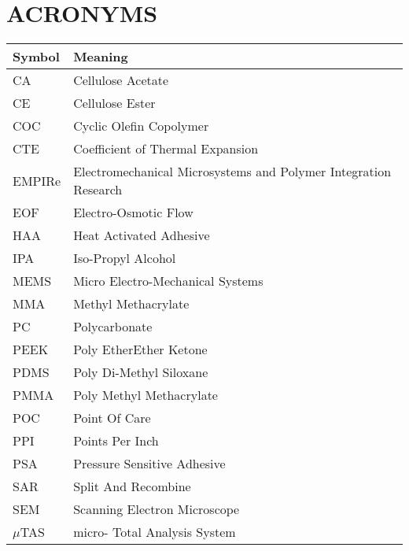 

\chapter*{\center\Huge{ACRONYMS}}


\begin{center}\small
\begin{tabular}{ll}\hline
\textbf{Symbol} & \textbf{Meaning}\\\hline
CA & Cellulose Acetate\\
CE & Cellulose Ester\\
COC & Cyclic Olefin Copolymer\\
CTE &Coefficient of Thermal Expansion\\
EMPIRe & Electromechanical Microsystems and Polymer Integration Research\\
EOF & Electro-Osmotic Flow\\
HAA & Heat Activated Adhesive\\
IPA & Iso-Propyl Alcohol\\
MEMS & Micro Electro-Mechanical Systems\\
MMA & Methyl Methacrylate\\
PC & Polycarbonate\\
PEEK &Poly EtherEther Ketone\\
PDMS & Poly Di-Methyl Siloxane\\
PMMA & Poly Methyl Methacrylate\\
POC & Point Of Care\\
PPI & Points Per Inch\\
PSA &Pressure Sensitive Adhesive\\
SAR & Split And Recombine\\
SEM & Scanning Electron Microscope\\
$\mu$TAS & micro- Total Analysis System\\


\hline
\end{tabular}
\end{center}

